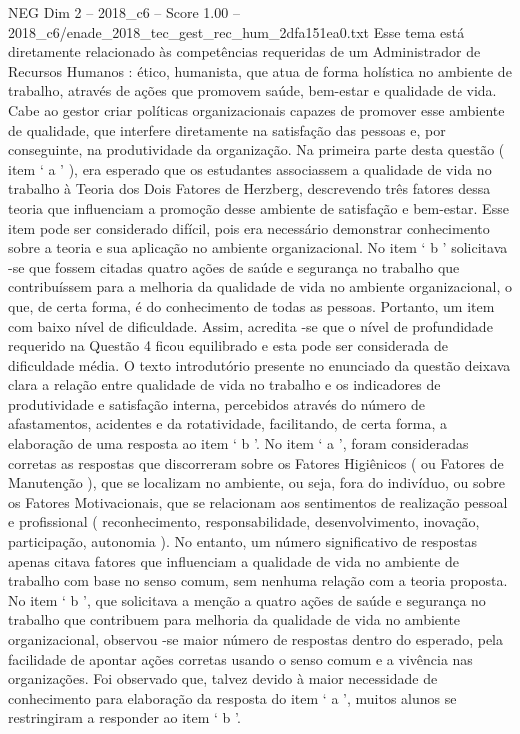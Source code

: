 \begin{textsample}{NEG Dim 2 – 2018\_c6 – Score 1.00 – 2018\_c6/enade\_2018\_tec\_gest\_rec\_hum\_2dfa151ea0.txt}
Esse tema está diretamente relacionado às competências requeridas de um Administrador de Recursos Humanos : ético, humanista, que atua de forma holística no ambiente de trabalho, através de ações que promovem saúde, bem-estar e qualidade de vida.
Cabe ao gestor criar políticas organizacionais capazes de promover esse ambiente de qualidade, que interfere diretamente na satisfação das pessoas e, por conseguinte, na produtividade da organização.
Na primeira parte desta questão ( item ‘ a ’ ), era esperado que os estudantes associassem a qualidade de vida no trabalho à Teoria dos Dois Fatores de Herzberg, descrevendo três fatores dessa teoria que influenciam a promoção desse ambiente de satisfação e bem-estar.
Esse item pode ser considerado difícil, pois era necessário demonstrar conhecimento sobre a teoria e sua aplicação no ambiente organizacional.
No item ‘ b ’ solicitava -se que fossem citadas quatro ações de saúde e segurança no trabalho que contribuíssem para a melhoria da qualidade de vida no ambiente organizacional, o que, de certa forma, é do conhecimento de todas as pessoas.
Portanto, um item com baixo nível de dificuldade.
Assim, acredita -se que o nível de profundidade requerido na Questão 4 ficou equilibrado e esta pode ser considerada de dificuldade média.
O texto introdutório presente no enunciado da questão deixava clara a relação entre qualidade de vida no trabalho e os indicadores de produtividade e satisfação interna, percebidos através do número de afastamentos, acidentes e da rotatividade, facilitando, de certa forma, a elaboração de uma resposta ao item ‘ b ’.
No item ‘ a ’, foram consideradas corretas as respostas que discorreram sobre os Fatores Higiênicos ( ou Fatores de Manutenção ), que se localizam no ambiente, ou seja, fora do indivíduo, ou sobre os Fatores Motivacionais, que se relacionam aos sentimentos de realização pessoal e profissional ( reconhecimento, responsabilidade, desenvolvimento, inovação, participação, autonomia ).
No entanto, um número significativo de respostas apenas citava fatores que influenciam a qualidade de vida no ambiente de trabalho com base no senso comum, sem nenhuma relação com a teoria proposta.
No item ‘ b ’, que solicitava a menção a quatro ações de saúde e segurança no trabalho que contribuem para melhoria da qualidade de vida no ambiente organizacional, observou -se maior número de respostas dentro do esperado, pela facilidade de apontar ações corretas usando o senso comum e a vivência nas organizações.
Foi observado que, talvez devido à maior necessidade de conhecimento para elaboração da resposta do item ‘ a ’, muitos alunos se restringiram a responder ao item ‘ b ’.

\end{textsample}
